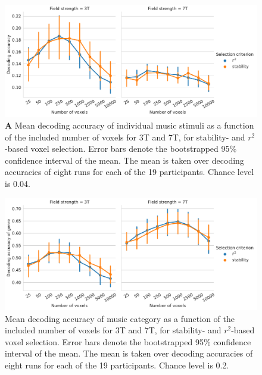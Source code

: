 \begin{figure}[H]
  \centering
    \includegraphics[width=\linewidth]{pics/decoding_selection.pdf}

	\caption{\textbf{A} Mean decoding accuracy of individual music stimuli as a function of
  the included number of voxels for 3T and 7T, for stability- and
  $r^2$-based voxel selection. Error bars denote the bootstrapped 95\%
  confidence interval of the mean. The mean is taken over decoding
  accuracies of eight runs for each of the 19 participants. Chance level is
    0.04.
}
 \label{fig:decoding_accuracy_stimulus_selection}
\end{figure}

\begin{figure}[H]
  \centering
  \includegraphics[width=\linewidth]{pics/decoding_genre_selection.pdf}

  \caption{Mean decoding accuracy of music category as a function of
  the included number of voxels for 3T and 7T, for stability- and
  $r^2$-based voxel selection. Error bars denote the bootstrapped 95\%
  confidence interval of the mean. The mean is taken over decoding
  accuracies of eight runs for each of the 19 participants. Chance level is 0.2.}

 \label{fig:decoding_accuracy_selection}
\end{figure}

